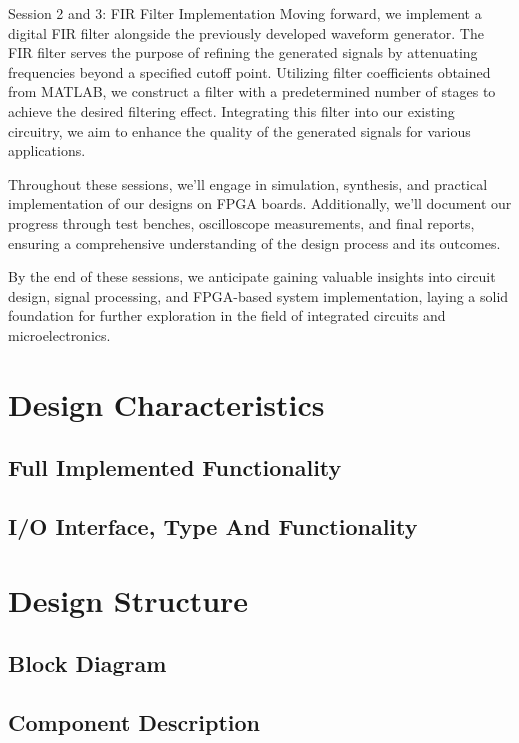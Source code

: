 \documentclass[a4paper, 12pt]{article}
\begin{document}
Session 2 and 3: FIR Filter Implementation
Moving forward, we implement a digital FIR filter alongside the previously developed waveform generator. The FIR filter serves the purpose of refining the generated signals by attenuating frequencies beyond a specified cutoff point. Utilizing filter coefficients obtained from MATLAB, we construct a filter with a predetermined number of stages to achieve the desired filtering effect. Integrating this filter into our existing circuitry, we aim to enhance the quality of the generated signals for various applications.

Throughout these sessions, we'll engage in simulation, synthesis, and practical implementation of our designs on FPGA boards. Additionally, we'll document our progress through test benches, oscilloscope measurements, and final reports, ensuring a comprehensive understanding of the design process and its outcomes.

By the end of these sessions, we anticipate gaining valuable insights into circuit design, signal processing, and FPGA-based system implementation, laying a solid foundation for further exploration in the field of integrated circuits and microelectronics.
\section{Design Characteristics}
\label{sec:org5b89b9e}

\subsection{Full Implemented Functionality}
\label{sec:org15b74cb}
\subsection{I/O Interface, Type And Functionality}
\label{sec:orgead3300}
\section{Design Structure}
\label{sec:org0f2b84f}

\subsection{Block Diagram}
\label{sec:org7e9f4b0}

\subsection{Component Description}
\label{sec:orgdbe5901}
\end{document}
